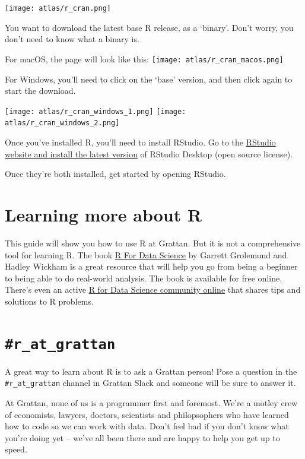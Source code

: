 \documentclass[
]{book}
\begin{document}
\texttt{[image: atlas/r\_cran.png]}

You want to download the latest base R release, as a `binary'. Don't worry, you don't need to know what a binary is.

For macOS, the page will look like this:
\texttt{[image: atlas/r\_cran\_macos.png]}

For Windows, you'll need to click on the `base' version, and then click again to start the download.

\texttt{[image: atlas/r\_cran\_windows\_1.png]} \texttt{[image: atlas/r\_cran\_windows\_2.png]}

Once you've installed R, you'll need to install RStudio. Go to the \href{https://www.rstudio.com/products/rstudio/download/\#download}{RStudio website and install the latest version} of RStudio Desktop (open source license).

Once they're both installed, get started by opening RStudio.

\hypertarget{learning-more-about-r}{%
\section{Learning more about R}\label{learning-more-about-r}}

This guide will show you how to use R at Grattan. But it is not a comprehensive tool for learning R. The book \href{https://r4ds.had.co.nz}{R For Data Science} by Garrett Grolemund and Hadley Wickham is a great resource that will help you go from being a beginner to being able to do real-world analysis. The book is available for free online. There's even an active \href{https://www.rfordatasci.com}{R for Data Science community online} that shares tips and solutions to R problems.

\hypertarget{r_at_grattan}{%
\section{\texorpdfstring{\texttt{\#r\_at\_grattan}}{\#r\_at\_grattan}}\label{r_at_grattan}}

A great way to learn about R is to ask a Grattan person! Pose a question in the \texttt{\#r\_at\_grattan} channel in Grattan Slack and someone will be sure to answer it.

At Grattan, none of us is a programmer first and foremost. We're a motley crew of economists, lawyers, doctors, scientists and philopsophers who have learned how to code so we can work with data. Don't feel bad if you don't know what you're doing yet -- we've all been there and are happy to help you get up to speed.
\end{document}
